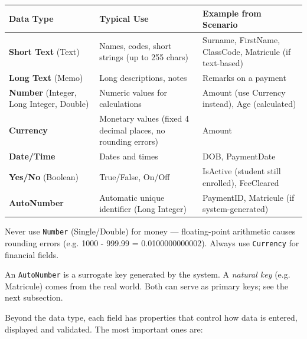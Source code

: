\documentclass[11pt]{article}
\newcounter{popsec}
\newcounter{popsub}
\newcommand{\courssub}[1]{%
  \stepcounter{popsub}%
  \par\vspace{9pt}\noindent{\popxbold\fontsize{11.5}{13}\selectfont\color{popink}{\color{poporange}\thepopsec.\thepopsub}\hspace{6pt}#1}\par\nopagebreak\vspace{4pt}
}
\begin{document}
\begin{center}
\begin{tabularx}{\linewidth}{|l|X|l|}\hline
\textbf{Data Type} & \textbf{Typical Use} & \textbf{Example from Scenario} \\ \hline
\textbf{Short Text} (Text) & Names, codes, short strings (up to 255 chars) & Surname, FirstName, ClassCode, Matricule (if text-based) \\ \hline
\textbf{Long Text} (Memo) & Long descriptions, notes & Remarks on a payment \\ \hline
\textbf{Number} (Integer, Long Integer, Double) & Numeric values for calculations & Amount (use Currency instead), Age (calculated) \\ \hline
\textbf{Currency} & Monetary values (fixed 4 decimal places, no rounding errors) & Amount \\ \hline
\textbf{Date/Time} & Dates and times & DOB, PaymentDate \\ \hline
\textbf{Yes/No} (Boolean) & True/False, On/Off & IsActive (student still enrolled), FeeCleared \\ \hline
\textbf{AutoNumber} & Automatic unique identifier (Long Integer) & PaymentID, Matricule (if system-generated) \\ \hline
\end{tabularx}
\end{center}

\begin{attention}
Never use \texttt{Number} (Single/Double) for money — floating-point arithmetic causes rounding errors (e.g. 1000 - 999.99 = 0.0100000000002). Always use \texttt{Currency} for financial fields.
\end{attention}

\begin{attention}
An \texttt{AutoNumber} is a surrogate key generated by the system. A \emph{natural key} (e.g. Matricule) comes from the real world. Both can serve as primary keys; see the next subsection.
\end{attention}

\courssub{Field Properties}

Beyond the data type, each field has properties that control how data is entered, displayed and validated. The most important ones are:
\end{document}
